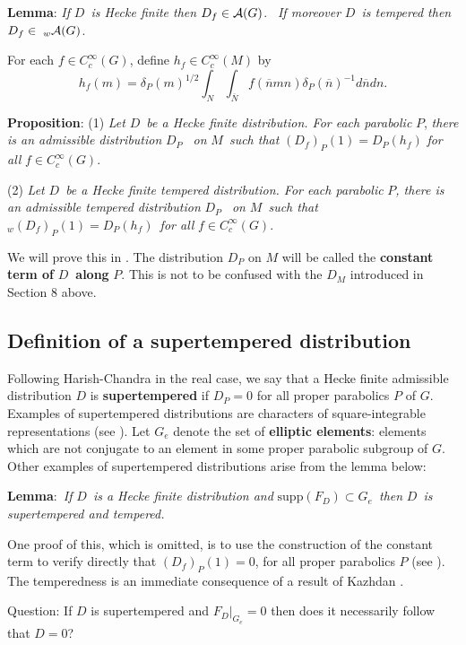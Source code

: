 \documentclass[11pt, a4paper]{article}
\begin{document}
{\bf Lemma}: {\em If }$D${\em \ is Hecke finite then }$D_f\in {\cal A}(G)$.%
{\em \ If moreover }$D${\em \ is tempered then }$D_f\in \;_w{\cal A}(G)$.

For each $f\in C_c^\infty (G)$, define $h_f\in C_c^\infty (M)$ by
\[
h_f(m)=\delta _P(m)^{1/2}\int_N\int_{\overline{N}}f(\overline{n}mn)\delta _P(%
\overline{n})^{-1}d\overline{n}dn.
\]

{\bf Proposition}: (1) {\em Let }$D${\em \ be a Hecke finite distribution.
For each parabolic }$P$, {\em there is an admissible distribution }$D_P${\em %
\ on }$M${\em \ such that }$(D_f)_P(1)=D_P(h_f)$ {\em for all }$f\in
C_c^\infty (G)$.

(2) {\em Let }$D${\em \ be a Hecke finite tempered distribution. For each
parabolic }$P${\em , there is an admissible tempered distribution }$D_P${\em %
\ on }$M${\em \ such that }$_w(D_f)_P(1)=D_P(h_f)${\em \ for all }$f\in
C_c^\infty (G)$.

We will prove this in \cite{J}. The distribution $D_P$ on $M$ will be called the 
{\bf constant term of }$D${\bf \ along }$P$. This is not to be confused with
the $D_M$ introduced in Section 8 above.

\subsection{Definition of a supertempered distribution}

Following Harish-Chandra in the real case, we say that a Hecke finite
admissible distribution $D$ is {\bf supertempered} if $D_P=0$ for all proper
parabolics $P$ of $G$. Examples of supertempered distributions are
characters of square-integrable representations (see \cite[Corollary~4.4.7]{S}).
Let $G_e$ denote the set of {\bf elliptic elements}: elements which are not
conjugate to an element in some proper parabolic subgroup of $G$. Other
examples of supertempered distributions arise from the lemma below:

{\bf Lemma}:{\em \ If }$D${\em \ is a Hecke finite distribution and }$\mathrm{supp}(F_D)\subset G_e${\em \ then }$D${\em \ is supertempered and tempered.}

One proof of this, which is omitted, is to use the construction of the
constant term to verify directly that $(D_f)_P(1)=0$, for all proper
parabolics $P$ (see \cite[\S 2]{J}). The temperedness is an immediate
consequence of a result of Kazhdan \cite[\S 5, Lemma~3]{K}.

{\sc Question}: If $D$ is supertempered and $F_D|_{G_e}=0$ then does it
necessarily follow that $D=0$?
\end{document}
